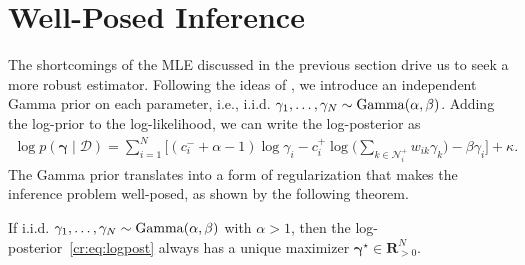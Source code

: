 \section{Well-Posed Inference} %
\label{cr:sec:inference}

The shortcomings of the MLE discussed in the previous section drive us to seek a more robust estimator.
Following the ideas of \citet{caron2012efficient}, we introduce an independent Gamma prior on each parameter, i.e., i.i.d. $\gamma_1, \ldots, \gamma_N \sim \mathrm{Gamma}( \alpha, \beta )$.
Adding the log-prior to the log-likelihood, we can write the log-posterior as
\begin{align}
\label{cr:eq:logpost}
\log p(\bm{\gamma} \mid \mathcal{D}) =
    \sum_{i = 1}^N \bigg[ (c^-_i + \alpha - 1) \log \gamma_i
        - c^+_i \log \bigg( \sum_{k \in \mathcal{N}^+_i} w_{ik} \gamma_k \bigg)  - \beta \gamma_i \bigg]
    + \kappa.
\end{align}
The Gamma prior translates into a form of regularization that makes the inference problem well-posed, as shown by the following theorem.

\begin{theorem}
\label{cr:thm:map}
If i.i.d. $\gamma_1, \ldots, \gamma_N \sim \mathrm{Gamma}( \alpha, \beta )$ with $\alpha > 1$, then the log-posterior~\eqref{cr:eq:logpost} always has a unique maximizer $\bm{\gamma}^\star \in \mathbf{R}^N_{>0}$.
\end{theorem}

